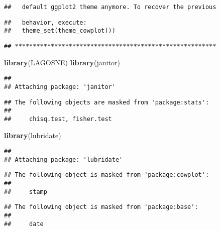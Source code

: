 \documentclass[]{article}
\newenvironment{Shaded}{\begin{snugshade}}{\end{snugshade}}
\newcommand{\KeywordTok}[1]{\textcolor[rgb]{0.13,0.29,0.53}{\textbf{#1}}}
\newcommand{\NormalTok}[1]{#1}
\begin{document}
\begin{verbatim}
##   default ggplot2 theme anymore. To recover the previous
\end{verbatim}

\begin{verbatim}
##   behavior, execute:
##   theme_set(theme_cowplot())
\end{verbatim}

\begin{verbatim}
## ********************************************************
\end{verbatim}

\begin{Shaded}
\begin{Highlighting}[]
\KeywordTok{library}\NormalTok{(LAGOSNE)}
\KeywordTok{library}\NormalTok{(janitor)}
\end{Highlighting}
\end{Shaded}

\begin{verbatim}
## 
## Attaching package: 'janitor'
\end{verbatim}

\begin{verbatim}
## The following objects are masked from 'package:stats':
## 
##     chisq.test, fisher.test
\end{verbatim}

\begin{Shaded}
\begin{Highlighting}[]
\KeywordTok{library}\NormalTok{(lubridate)}
\end{Highlighting}
\end{Shaded}

\begin{verbatim}
## 
## Attaching package: 'lubridate'
\end{verbatim}

\begin{verbatim}
## The following object is masked from 'package:cowplot':
## 
##     stamp
\end{verbatim}

\begin{verbatim}
## The following object is masked from 'package:base':
## 
##     date
\end{verbatim}
\end{document}
